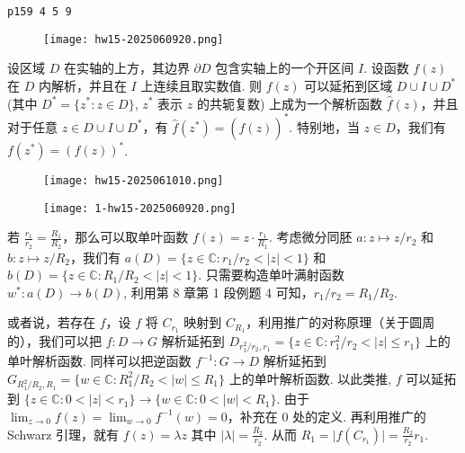 \begin{lstlisting}
p159 4 5 9
\end{lstlisting}
\begin{exercise}
\begin{figure}[H]
\centering
\texttt{[image: hw15-2025060920.png]}
\label{}
\end{figure}
\end{exercise}
\begin{theorem}
设区域 $D$ 在实轴的上方，其边界 $\partial D$ 包含实轴上的一个开区间 $I$. 设函数 $f(z)$ 在 $D$ 内解析，并且在 $I$ 上连续且取实数值. 则 $f(z)$ 可以延拓到区域 $D \cup I \cup D^*$ (其中 $D^* = \{z^* : z \in D\}$, $z^*$ 表示 $z$ 的共轭复数) 上成为一个解析函数 $\widehat{f}(z)$，并且对于任意 $z \in D \cup I \cup D^*$，有 $\widehat{f}(z^*) = (\widehat{f}(z))^*$. 特别地，当 $z \in D$，我们有 $f(z^*) = (f(z))^*$.
\end{theorem}
\begin{figure}[H]
\centering
\texttt{[image: hw15-2025061010.png]}
\label{}
\end{figure}

\begin{exercise}
\begin{figure}[H]
\centering
\texttt{[image: 1-hw15-2025060920.png]}
\label{}
\end{figure}
\end{exercise}
若 $\frac{r_1}{r_2}=\frac{R_1}{R_2}$，那么可以取单叶函数 $f(z)=z\cdot\frac{r_1}{R_1}$. 考虑微分同胚 $a:z\mapsto z/r_2$ 和 $b:z\mapsto z/R_2$，我们有 $a(D)=\{ z\in \mathbb{C}:r_1/r_2<\lvert z \rvert<1 \}$ 和 $b(D)=\{ z\in \mathbb{C}:R_1/R_2<\lvert z \rvert<1 \}$. 只需要构造单叶满射函数 $w^{*}:a(D)\to b(D)$, 利用第 8 章第 1 段例题 4 可知，$r_1/r_2=R_1/R_2$.

或者说，若存在 $f$，设 $f$ 将 $C_{r_1}$ 映射到 $C_{R_1}$，利用推广的对称原理（关于圆周的），我们可以把 $f:D\to G$ 解析延拓到 $D_{r_1^{2}/r_2,r_1}=\{ z\in \mathbb{C}: r_1^{2}/r_2<\lvert z \rvert\leq r_1\}$ 上的单叶解析函数. 同样可以把逆函数 $f^{-1}:G\to D$ 解析延拓到 $G_{R_1^{2}/R_2,R_{1}}=\{ w\in \mathbb{C}:R_1^{2}/R_2<\lvert w \rvert\leq R_1 \}$ 上的单叶解析函数. 以此类推, $f$ 可以延拓到 $\{ z\in \mathbb{C}:0<\lvert z \rvert<r_1 \}\to \{ w\in \mathbb{C}:0<\lvert w \rvert<R_1 \}$. 由于 $\lim_{ z \to 0 }f(z)=\lim_{ w \to 0 }f^{-1}(w)=0$，补充在 0 处的定义. 再利用推广的 Schwarz 引理，就有 $f(z)=\lambda z$ 其中 $\lvert \lambda \rvert=\frac{R_2}{r_2}$. 从而 $R_1=\lvert f(C_{r_1}) \rvert=\frac{R_2}{r_2}r_1$.


